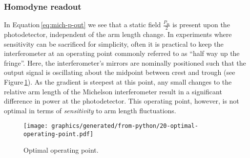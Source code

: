 \subsubsection{\label{sec:homodyne-readout}Homodyne readout}





In Equation\,\ref{eq:mich-p-out} we see that a static field $\frac{P_{\text{in}}}{2}$ is present upon the photodetector, independent of the arm length change. In experiments where sensitivity can be sacrificed for simplicity, often it is practical to keep the interferometer at an operating point commonly referred to as ``half way up the fringe''. Here, the interferometer's mirrors are nominally positioned such that the output signal is oscillating about the midpoint between crest and trough (see Figure\,\ref{fig:optimal-operating-point}). As the gradient is steepest at this point, any small changes to the relative arm length of the Michelson interferometer result in a significant difference in power at the photodetector. This operating point, however, is not optimal in terms of \emph{sensitivity} to arm length fluctuations.

\begin{figure}
  \centering
  \texttt{[image: graphics/generated/from-python/20-optimal-operating-point.pdf]}
  \caption[Fringe]{\label{fig:optimal-operating-point}Optimal operating point.}
\end{figure}

